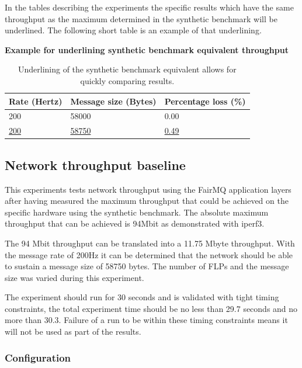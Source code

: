 \documentclass[]{article}
\begin{document}
In the tables describing the experiments the specific results which have the same throughput as the maximum determined in the synthetic benchmark will be underlined. The following short table is an example of that underlining.

\begin{table}[H]
	\textbf{Example for underlining synthetic benchmark equivalent throughput}
	\begin{center}
		\begin{tabular}{ | l | l | l | }
			\hline
			\textbf{Rate (Hertz)} & \textbf{Message size (Bytes)} & \textbf{Percentage loss (\%)} \\ \hline
			
			200 & 58000 & 0.00 \\ \hline
			\underline{200} & \underline{58750} & \underline{0.49} \\ \hline
		\end{tabular}
		\caption{Underlining of the synthetic benchmark equivalent allows for quickly comparing results.}
		\label{tab:benchmark}
	\end{center}
\end{table}

\subsection{Network throughput baseline}
This experiments tests network throughput using the FairMQ application layers after having measured the maximum throughput that could be achieved on the specific hardware using the synthetic benchmark. The absolute maximum throughput that can be achieved is 94Mbit as demonstrated with iperf3.

The 94 Mbit throughput can be translated into a 11.75 Mbyte throughput. With the message rate of 200Hz it can be determined that the network should be able to sustain a message size of 58750 bytes. The number of FLPs and the message size was varied during this experiment.

The experiment should run for 30 seconds and is validated with tight timing constraints, the total experiment time should be no less than 29.7 seconds and no more than 30.3. Failure of a run to be within these timing constraints means it will not be used as part of the results.

\subsubsection{Configuration}
\end{document}
